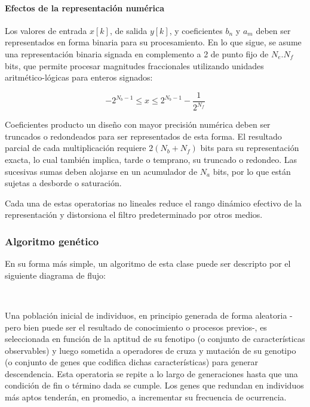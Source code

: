 \documentclass[11pt]{article}
\begin{document}
    \paragraph{Efectos de la representación
numérica}\label{efectos-de-la-representaciuxf3n-numuxe9rica}

Los valores de entrada \(x[k]\), de salida \(y[k]\), y coeficientes
\(b_n\) y \(a_m\) deben ser representados en forma binaria para su
procesamiento. En lo que sigue, se asume una representación binaria
signada en complemento a 2 de punto fijo de \(N_e.N_f\) bits, que
permite procesar magnitudes fraccionales utilizando unidades
aritmético-lógicas para enteros signados:

\[ -2^{N_b-1} \leq x \leq 2^{N_b-1}-\frac{1}{2^{N_f}} \]

Coeficientes producto un diseño con mayor precisión numérica deben ser
truncados o redondeados para ser representados de esta forma. El
resultado parcial de cada multiplicación requiere \(2(N_b + N_f)\) bits
para su representación exacta, lo cual también implica, tarde o
temprano, su truncado o redondeo. Las sucesivas sumas deben alojarse en
un acumulador de \(N_a\) bits, por lo que están sujetas a desborde o
saturación.

Cada una de estas operatorias no lineales reduce el rango dinámico
efectivo de la representación y distorsiona el filtro predeterminado por
otros medios.

    \subsubsection{Algoritmo genético}\label{algoritmo-genuxe9tico}

En su forma más simple, un algoritmo de esta clase puede ser descripto
por el siguiente diagrama de flujo:

    
    \begin{center}
    \end{center}
    { \hspace*{\fill} \\}
    

    Una población inicial de individuos, en principio generada de forma
aleatoria -pero bien puede ser el resultado de conocimiento o procesos
previos-, es seleccionada en función de la aptitud de su fenotipo (o
conjunto de características observables) y luego sometida a operadores
de cruza y mutación de su genotipo (o conjunto de genes que codifica
dichas características) para generar descendencia. Esta operatoria se
repite a lo largo de generaciones hasta que una condición de fin o
término dada se cumple. Los genes que redundan en individuos más aptos
tenderán, en promedio, a incrementar su frecuencia de ocurrencia.
\end{document}
